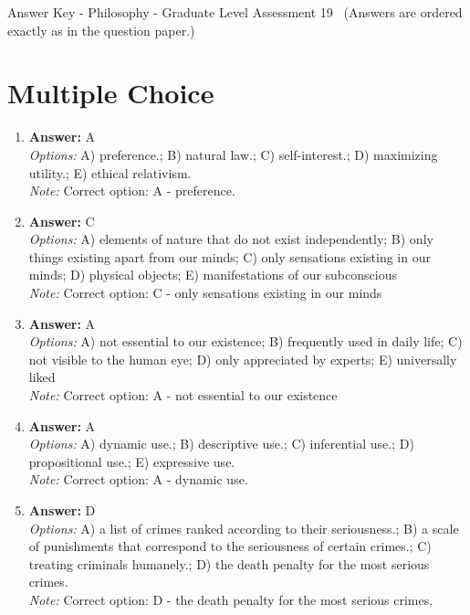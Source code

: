 \documentclass[12pt]{article}
\begin{document}
\begin{center}
Answer Key - Philosophy - Graduate Level Assessment 19 \
\small (Answers are ordered exactly as in the question paper.)
\end{center}

\section*{Multiple Choice}
\begin{enumerate}[label=\arabic*.]
\item \textbf{Answer:} A
\\ \textit{Options:} A) preference.; B) natural law.; C) self-interest.; D) maximizing utility.; E) ethical relativism.
\\ \textit{Note:} Correct option: A - preference.
\item \textbf{Answer:} C
\\ \textit{Options:} A) elements of nature that do not exist independently; B) only things existing apart from our minds; C) only sensations existing in our minds; D) physical objects; E) manifestations of our subconscious
\\ \textit{Note:} Correct option: C - only sensations existing in our minds
\item \textbf{Answer:} A
\\ \textit{Options:} A) not essential to our existence; B) frequently used in daily life; C) not visible to the human eye; D) only appreciated by experts; E) universally liked
\\ \textit{Note:} Correct option: A - not essential to our existence
\item \textbf{Answer:} A
\\ \textit{Options:} A) dynamic use.; B) descriptive use.; C) inferential use.; D) propositional use.; E) expressive use.
\\ \textit{Note:} Correct option: A - dynamic use.
\item \textbf{Answer:} D
\\ \textit{Options:} A) a list of crimes ranked according to their seriousness.; B) a scale of punishments that correspond to the seriousness of certain crimes.; C) treating criminals humanely.; D) the death penalty for the most serious crimes.
\\ \textit{Note:} Correct option: D - the death penalty for the most serious crimes.
\end{enumerate}
\end{document}
